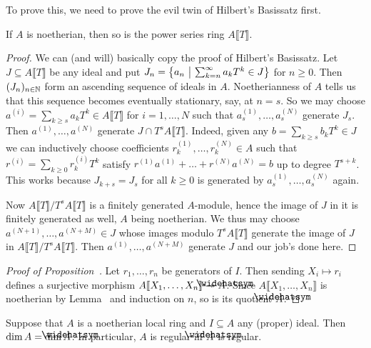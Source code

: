 \documentclass[a4paper,parskip=half,numbers=enddot, DIV=12]{scrreprt}
\renewcommand{\geq}{\geqslant}
\begin{document}
To prove this, we need to prove the evil twin of Hilbert's Basissatz first.
\begin{lem}
	If $A$ is noetherian, then so is the power series ring $A\llbracket T\rrbracket$.
\end{lem}
\begin{proof}
	We can (and will) basically copy the proof of Hilbert's Basissatz. Let $J\subseteq A\llbracket T\rrbracket$ be any ideal and put $J_n=\left\{a_n\ \middle|\  \sum_{k=n}^\infty a_kT^k\in J\right\}$ for $n\geq 0$. Then $(J_n)_{n\in \mathbb{N}}$ form an ascending sequence of ideals in $A$. Noetherianness of $A$ tells us that this sequence becomes eventually stationary, say, at $n=s$. So we may choose $a^{(i)}=\sum_{k\geq s}a_kT^k\in A\llbracket T\rrbracket$ for $i=1,\ldots,N$ such that $a_s^{(1)},\ldots,a_s^{(N)}$ generate $J_s$. Then $a^{(1)},\ldots,a^{(N)}$ generate $J\cap T^sA\llbracket T\rrbracket$. Indeed, given any $b=\sum_{k\geq s}b_kT^k\in J$ we can inductively choose coefficients $r_k^{(1)},\ldots,r_k^{(N)}\in A$ such that $r^{(i)}=\sum_{k\geq 0}r_k^{(i)}T^k$ satisfy $r^{(1)}a^{(1)}+\ldots+r^{(N)}a^{(N)}=b$ up to degree $T^{s+k}$. This works because $J_{k+s}=J_s$ for all $k\geq 0$ is generated by $a_s^{(1)},\ldots,a_s^{(N)}$ again.
	
	Now $A\llbracket T\rrbracket/T^sA\llbracket T\rrbracket$ is a finitely generated $A$-module, hence the image of $J$ in it is finitely generated as well, $A$ being noetherian. We thus may choose $a^{(N+1)},\ldots,a^{(N+M)}\in J$ whose images modulo $T^sA\llbracket T\rrbracket$ generate the image of $J$ in $A\llbracket T\rrbracket/T^sA\llbracket T\rrbracket$. Then $a^{(1)},\ldots,a^{(N+M)}$ generate $J$ and our job's done here.
\end{proof}
\begin{proof}[Proof of Proposition~]
	Let $r_1,\ldots,r_n$ be generators of $I$. Then sending $X_i\mapsto r_i$ defines a surjective morphism $A\llbracket X_1,\ldots,X_n\rrbracket\epimorphism \roof{A}$. Since $A\llbracket X_1,\ldots,X_n\rrbracket$ is noetherian by Lemma~ and induction on $n$, so is its quotient $\roof{A}$.
\end{proof}
\begin{cor}
	Suppose that $A$ is a noetherian local ring and $I\subseteq A$ any (proper) ideal. Then $\dim A=\dim\roof{A}$. In particular, $A$ is regular iff $\roof{A}$ is regular.
\end{cor}
\end{document}
